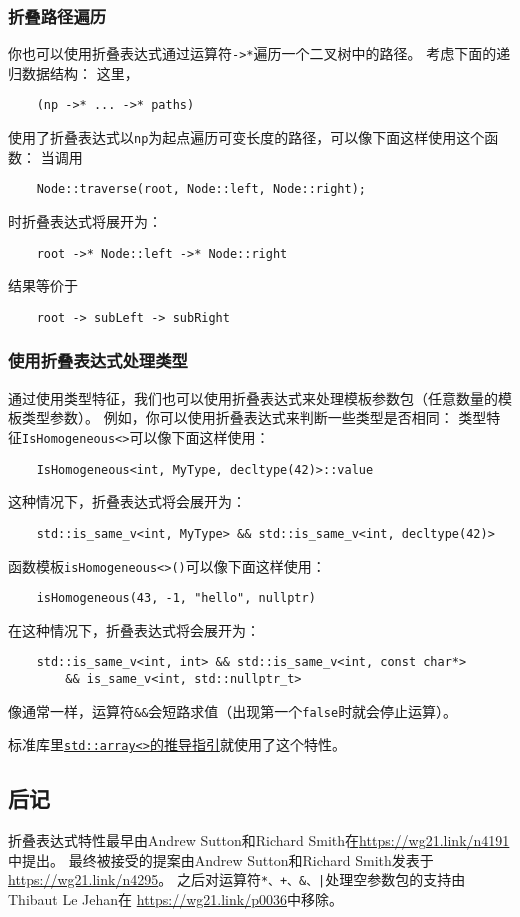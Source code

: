 \subsubsection*{折叠路径遍历}
你也可以使用折叠表达式通过运算符\texttt{->*}遍历一个二叉树中的路径。
考虑下面的递归数据结构：
这里，
\begin{lstlisting}
    (np ->* ... ->* paths)
\end{lstlisting}
使用了折叠表达式以\texttt{np}为起点遍历可变长度的路径，可以像下面这样使用这个函数：
当调用
\begin{lstlisting}
    Node::traverse(root, Node::left, Node::right);
\end{lstlisting}
时折叠表达式将展开为：
\begin{lstlisting}
    root ->* Node::left ->* Node::right
\end{lstlisting}
结果等价于
\begin{lstlisting}
    root -> subLeft -> subRight
\end{lstlisting}

\subsubsection{使用折叠表达式处理类型}
通过使用类型特征，我们也可以使用折叠表达式来处理模板参数包（任意数量的模板类型参数）。
例如，你可以使用折叠表达式来判断一些类型是否相同：
类型特征\texttt{IsHomogeneous<>}可以像下面这样使用：
\begin{lstlisting}
    IsHomogeneous<int, MyType, decltype(42)>::value
\end{lstlisting}
这种情况下，折叠表达式将会展开为：
\begin{lstlisting}
    std::is_same_v<int, MyType> && std::is_same_v<int, decltype(42)>
\end{lstlisting}
函数模板\texttt{isHomogeneous<>()}可以像下面这样使用：
\begin{lstlisting}
    isHomogeneous(43, -1, "hello", nullptr)
\end{lstlisting}
在这种情况下，折叠表达式将会展开为：
\begin{lstlisting}
    std::is_same_v<int, int> && std::is_same_v<int, const char*>
        && is_same_v<int, std::nullptr_t>
\end{lstlisting}
像通常一样，运算符\texttt{\&\&}会短路求值（出现第一个\texttt{false}时就会停止运算）。

标准库里\hyperref[ch9.2.6.3]{\texttt{std::array<>}的推导指引}就使用了这个特性。

\subsection{后记}
折叠表达式特性最早由Andrew Sutton和Richard Smith在\url{https://wg21.link/n4191}中提出。
最终被接受的提案由Andrew Sutton和Richard Smith发表于\url{https://wg21.link/n4295}。
之后对运算符\texttt{*、+、\&、|}处理空参数包的支持由Thibaut Le Jehan在
\url{https://wg21.link/p0036}中移除。
